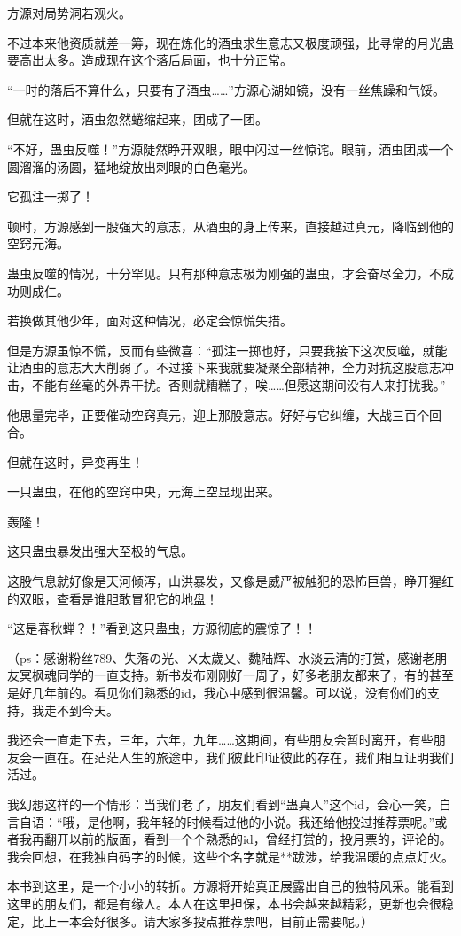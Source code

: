 \begin{this_body}
方源对局势洞若观火。

不过本来他资质就差一筹，现在炼化的酒虫求生意志又极度顽强，比寻常的月光蛊要高出太多。造成现在这个落后局面，也十分正常。

“一时的落后不算什么，只要有了酒虫……”方源心湖如镜，没有一丝焦躁和气馁。

但就在这时，酒虫忽然蜷缩起来，团成了一团。

“不好，蛊虫反噬！”方源陡然睁开双眼，眼中闪过一丝惊诧。眼前，酒虫团成一个圆溜溜的汤圆，猛地绽放出刺眼的白色毫光。

它孤注一掷了！

顿时，方源感到一股强大的意志，从酒虫的身上传来，直接越过真元，降临到他的空窍元海。

蛊虫反噬的情况，十分罕见。只有那种意志极为刚强的蛊虫，才会奋尽全力，不成功则成仁。

若换做其他少年，面对这种情况，必定会惊慌失措。

但是方源虽惊不慌，反而有些微喜：“孤注一掷也好，只要我接下这次反噬，就能让酒虫的意志大大削弱了。不过接下来我就要凝聚全部精神，全力对抗这股意志冲击，不能有丝毫的外界干扰。否则就糟糕了，唉……但愿这期间没有人来打扰我。”

他思量完毕，正要催动空窍真元，迎上那股意志。好好与它纠缠，大战三百个回合。

但就在这时，异变再生！

一只蛊虫，在他的空窍中央，元海上空显现出来。

轰隆！

这只蛊虫暴发出强大至极的气息。

这股气息就好像是天河倾泻，山洪暴发，又像是威严被触犯的恐怖巨兽，睁开猩红的双眼，查看是谁胆敢冒犯它的地盘！

“这是春秋蝉？！”看到这只蛊虫，方源彻底的震惊了！！

（ps：感谢粉丝789、失落の光、ㄨ太歲乂、魏陆辉、水淡云清的打赏，感谢老朋友冥枫魂同学的一直支持。新书发布刚刚好一周了，好多老朋友都来了，有的甚至是好几年前的。看见你们熟悉的id，我心中感到很温馨。可以说，没有你们的支持，我走不到今天。

我还会一直走下去，三年，六年，九年……这期间，有些朋友会暂时离开，有些朋友会一直在。在茫茫人生的旅途中，我们彼此印证彼此的存在，我们相互证明我们活过。

我幻想这样的一个情形：当我们老了，朋友们看到“蛊真人”这个id，会心一笑，自言自语：“哦，是他啊，我年轻的时候看过他的小说。我还给他投过推荐票呢。”或者我再翻开以前的版面，看到一个个熟悉的id，曾经打赏的，投月票的，评论的。我会回想，在我独自码字的时候，这些个名字就是**跋涉，给我温暖的点点灯火。

本书到这里，是一个小小的转折。方源将开始真正展露出自己的独特风采。能看到这里的朋友们，都是有缘人。本人在这里担保，本书会越来越精彩，更新也会很稳定，比上一本会好很多。请大家多投点推荐票吧，目前正需要呢。）

\end{this_body}

